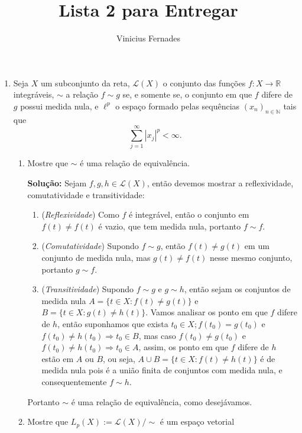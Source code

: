 \documentclass{article}
\begin{document}
	
	\title{Lista 2 para Entregar}
	\author{Vinicius Fernades}
	
	\maketitle
	
	\begin{enumerate}
		\item Seja $X$ um subconjunto da reta, $\mathcal{L}(X)$ o conjunto das funções $f:X \to \mathbb{R}$ integráveis, $\sim$ a relação $f \sim g$ se, e somente se, o conjunto em que $f$ difere de $g$ possui medida nula, e $\ell^{p}$ o espaço formado pelas sequências $(x_n)_{n \in \mathbb{N}}$ tais que
		$$
		\sum \limits_{j=1}^{\infty} |x_j|^{p} < \infty.
		$$
		\begin{enumerate}
			\item Mostre que $\sim$ é uma relação de equivalência.
			
			\textbf{Solução:} Sejam $f, g, h \in \mathcal{L}(X)$, então devemos mostrar a reflexividade, comutatividade e transitividade:
			\begin{enumerate}
				\item (\textit{Reflexividade}) Como $f$ é integrável, então o conjunto em $f(t) \neq f(t)$ é vazio, que tem medida nula, portanto $f \sim f$.
				
				\item (\textit{Comutatividade}) Supondo $f \sim g$, então $f(t) \neq g(t)$ em um conjunto de medida nula, mas $g(t) \neq f(t)$ nesse mesmo conjunto, portanto $g \sim f$. 
				
				\item (\textit{Transitividade}) Supondo $f \sim g$ e $g \sim h$, então sejam os conjuntos de medida nula $A=\{t \in X: f(t) \neq g(t)\}$ e $B=\{t \in X: g(t) \neq h(t)\}$. Vamos analisar os ponto em que $f$ difere de $h$, então suponhamos que exista $t_0 \in X; f(t_0) = g(t_0)$ e $f(t_0) \neq h(t_0) \Rightarrow t_0 \in B$, mas caso  $f(t_0) \neq g(t_0)$ e $f(t_0) \neq h(t_0) \Rightarrow t_0 \in A$, assim, os ponto em que $f$ difere de $h$ estão em $A$ ou $B$, ou seja, $A\cup B=\{ t \in X: f(t) \neq h(t) \}$ é de medida nula pois é a união finita de conjuntos com medida nula, e consequentemente $f \sim h$.  
			\end{enumerate}
			Portanto $\sim$ é uma relação de equivalência, como desejávamos. 
			
			
			\item Mostre que $L_{p}(X) := \mathcal{L}(X)/\sim$ é um espaço vetorial
			

\end{enumerate}
\end{enumerate}
\end{document}

